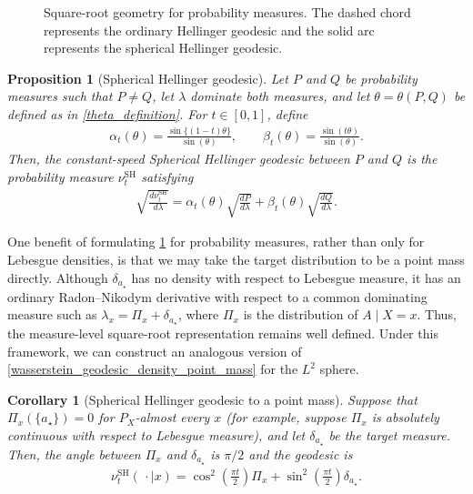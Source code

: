 \documentclass[11pt,twoside]{article}
\newtheorem{corollary}{Corollary}
\newtheorem{proposition}{Proposition}
\theoremstyle{definition}
\theoremstyle{remark}
\begin{document}
\begin{figure}[h]
\caption{
Square-root geometry for probability measures. The dashed chord represents the ordinary Hellinger geodesic and the solid arc represents the spherical Hellinger geodesic.}
\label{fig:hellinger_vs_fisherrao}
\end{figure}



\begin{proposition}[Spherical Hellinger geodesic]
\label{fr_geodesic}
Let $P$ and $Q$ be probability measures such that $P \neq Q$, let $\lambda$ dominate both measures, and let $\theta = \theta(P, Q)$ be defined as in \cref{theta_definition}. For $t\in[0,1]$, define
\begin{align*}
    \alpha_t(\theta) = \frac{\sin\{(1-t)\theta\}}{\sin(\theta)}, \qquad \beta_t(\theta) = \frac{\sin(t\theta)}{\sin(\theta)}.
\end{align*}
Then, the constant-speed Spherical Hellinger geodesic between $P$ and $Q$ is the probability measure $\nu^{\mathrm{SH}}_t$ satisfying
\begin{align*} 
    \sqrt{\frac{d\nu^{\mathrm{SH}}_t}{d\lambda}}
    =
    \alpha_t(\theta)
    \sqrt{\frac{dP}{d\lambda}}
    +
    \beta_t(\theta)
    \sqrt{\frac{dQ}{d\lambda}}.
\end{align*}
\end{proposition}


One benefit of formulating \cref{fr_geodesic} for probability measures, rather than only for Lebesgue densities, is that we may take the target distribution to be a point mass directly. Although $\delta_{a_\star}$ has no density with respect to Lebesgue measure, it has an ordinary Radon--Nikodym derivative with respect to a common dominating measure such as $\lambda_x=\Pi_x+\delta_{a_\star}$, 
where $\Pi_x$ is the distribution of $A \mid X = x$. Thus, the measure-level square-root representation remains well defined. Under this framework, we can construct an analogous version of \cref{wasserstein_geodesic_density_point_mass} for the $L^2$ sphere. 
\begin{corollary}[Spherical Hellinger geodesic to a point mass] \label{fr_pointmass}
    Suppose that $\Pi_x(\{a_\star\})=0$ for $P_X$-almost every $x$ (for example, suppose $\Pi_x$ is absolutely continuous with respect to Lebesgue measure), and let $\delta_{a_\star}$ be the target measure. Then, the angle between $\Pi_x$ and $\delta_{a_\star}$ is $\pi/2$ and the geodesic is
\begin{align*}
    \nu_t^{\mathrm{SH}}(\,\cdot\mid x) = \cos^2\left(\frac{\pi t}{2}\right)\Pi_x + \sin^2\left(\frac{\pi t}{2}\right)\delta_{a_\star}.
\end{align*}
\end{corollary}
\end{document}
